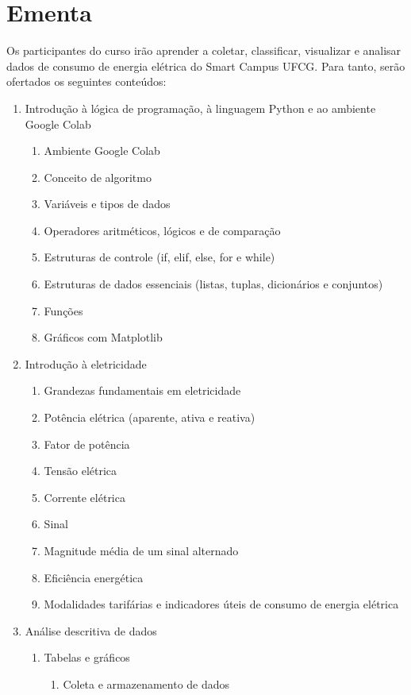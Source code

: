 \section{Ementa}
Os participantes do curso irão aprender a coletar, classificar, visualizar e analisar dados de consumo de energia elétrica do Smart Campus UFCG. Para tanto, serão ofertados os seguintes conteúdos:

\begin{enumerate}
	\item Introdução à lógica de programação, à linguagem Python e ao ambiente Google Colab
		\begin{enumerate}
			\item Ambiente Google Colab
			\item Conceito de algoritmo
			\item Variáveis e tipos de dados
			\item Operadores aritméticos, lógicos e de comparação
			\item Estruturas de controle (if, elif, else, for e while)
			\item Estruturas de dados essenciais (listas, tuplas, dicionários e conjuntos)
			\item Funções
			\item Gráficos com Matplotlib
		\end{enumerate}
	\item Introdução à eletricidade
		\begin{enumerate}
			\item Grandezas fundamentais em eletricidade
			\item Potência elétrica (aparente, ativa e reativa)
			\item Fator de potência
			\item Tensão elétrica
			\item Corrente elétrica
			\item Sinal
			\item Magnitude média de um sinal alternado
			\item Eficiência energética
			\item Modalidades tarifárias e indicadores úteis de consumo de energia elétrica
		\end{enumerate}
	\item Análise descritiva de dados
		\begin{enumerate}
			\item Tabelas e gráficos
			\begin{enumerate}
				\item Coleta e armazenamento de dados

\end{enumerate}
\end{enumerate}
\end{enumerate}
